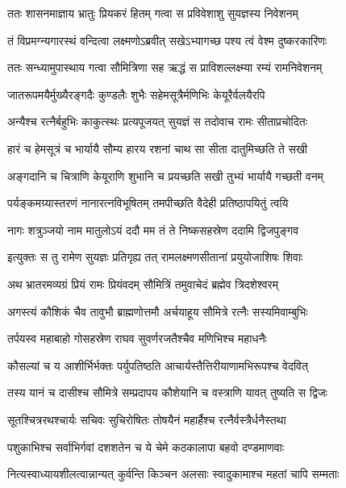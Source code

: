 
\twolineshloka
{ततः शासनमाज्ञाय भ्रातुः प्रियकरं हितम्}
{गत्वा स प्रविवेशाशु सुयज्ञस्य निवेशनम्} %

\twolineshloka
{तं विप्रमग्न्यगारस्थं वन्दित्वा लक्ष्मणोऽब्रवीत्}
{सखेऽभ्यागच्छ पश्य त्वं वेश्म दुष्करकारिणः} %

\twolineshloka
{ततः सन्ध्यामुपास्थाय गत्वा सौमित्रिणा सह}
{ऋद्धं स प्राविशल्लक्ष्म्या रम्यं रामनिवेशनम्} %

\twolineshloka
{जातरूपमयैर्मुख्यैरङ्गदैः कुण्डलैः शुभैः}
{सहेमसूत्रैर्मणिभिः केयूरैर्वलयैरपि} %

\twolineshloka
{अन्यैश्च रत्नैर्बहुभिः काकुत्स्थः प्रत्यपूजयत्}
{सुयज्ञं स तदोवाच रामः सीताप्रचोदितः} %

\twolineshloka
{हारं च हेमसूत्रं च भार्यायै सौम्य हारय}
{रशनां चाथ सा सीता दातुमिच्छति ते सखी} %

\twolineshloka
{अङ्गदानि च चित्राणि केयूराणि शुभानि च}
{प्रयच्छति सखी तुभ्यं भार्यायै गच्छती वनम्} %

\twolineshloka
{पर्यङ्कमग्र्यास्तरणं नानारत्नविभूषितम्}
{तमपीच्छति वैदेही प्रतिष्ठापयितुं त्वयि} %

\twolineshloka
{नागः शत्रुञ्जयो नाम मातुलोऽयं ददौ मम}
{तं ते निष्कसहस्रेण ददामि द्विजपुङ्गव} %

\twolineshloka
{इत्युक्तः स तु रामेण सुयज्ञः प्रतिगृह्य तत्}
{रामलक्ष्मणसीतानां प्रयुयोजाशिषः शिवाः} %

\twolineshloka
{अथ भ्रातरमव्यग्रं प्रियं रामः प्रियंवदम्}
{सौमित्रिं तमुवाचेदं ब्रह्मेव त्रिदशेश्वरम्} %

\twolineshloka
{अगस्त्यं कौशिकं चैव तावुभौ ब्राह्मणोत्तमौ}
{अर्चयाहूय सौमित्रे रत्नैः सस्यमिवाम्बुभिः} %

\twolineshloka
{तर्पयस्व महाबाहो गोसहस्रेण राघव}
{सुवर्णरजतैश्चैव मणिभिश्च महाधनैः} %

\twolineshloka
{कौसल्यां च य आशीर्भिर्भक्तः पर्युपतिष्ठति}
{आचार्यस्तैत्तिरीयाणामभिरूपश्च वेदवित्} %

\twolineshloka
{तस्य यानं च दासीश्च सौमित्रे सम्प्रदापय}
{कौशेयानि च वस्त्राणि यावत् तुष्यति स द्विजः} %

\twolineshloka
{सूतश्चित्ररथश्चार्यः सचिवः सुचिरोषितः}
{तोषयैनं महार्हैश्च रत्नैर्वस्त्रैर्धनैस्तथा} %

\twolineshloka
{पशुकाभिश्च सर्वाभिर्गवां दशशतेन च}
{ये चेमे कठकालापा बहवो दण्डमाणवाः} %

\twolineshloka
{नित्यस्वाध्यायशीलत्वान्नान्यत् कुर्वन्ति किञ्चन}
{अलसाः स्वादुकामाश्च महतां चापि सम्मताः} %

